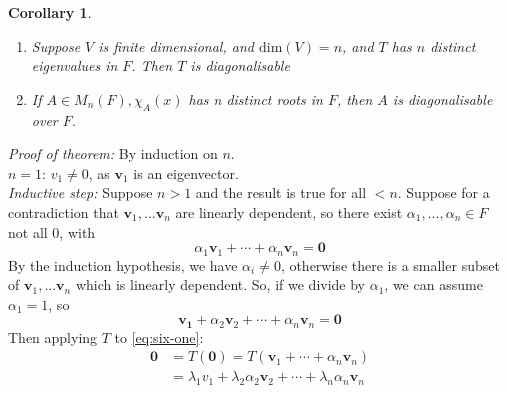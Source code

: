 \documentclass{report}
\newtheorem*{corollary}{Corollary}
\theoremstyle{remark}
\theoremstyle{definition}
\theoremstyle{definition}
\theoremstyle{theorem}
\renewcommand{\v}[1]{\mathbf{#1}}
\begin{document}
\begin{corollary}
\begin{enumerate}[label=(\arabic*)]
    \item Suppose $V$ is finite dimensional, and $\mathrm{dim}(V)=n$, and $T$ has $n$ distinct eigenvalues in $F$. Then $T$ is diagonalisable
    \item If $A \in M_n(F), \chi_A(x)$ has n distinct roots in $F$, then $A$ is diagonalisable over $F$.
\end{enumerate}

\end{corollary}
\emph{Proof of theorem:} By induction on $n$.\\
$n=1$: $v_1\neq 0$, as $\v{v}_1$ is an eigenvector.\\
\emph{Inductive step:} Suppose $n>1$ and the result is true for all $<n$. Suppose for a contradiction that $\v{v}_1,...\v{v}_n$ are linearly dependent, so there exist $\alpha_1,...,\alpha_n \in F$ not all 0, with
\[\alpha_1\v{v}_1+ \cdots + \alpha_n\v{v}_n=\v{0}\]
By the induction hypothesis, we have $\alpha_i\neq 0$, otherwise there is a smaller subset of $\v{v}_1,...\v{v}_n$ which is linearly dependent. So, if we divide by $\alpha_1$, we can assume $\alpha_1=1$, so
\begin{equation}
    \v{v_1}+\alpha_2\v{v}_2+\cdots+\alpha_n\v{v}_n=\v{0}\label{eq:six-one}
\end{equation}
Then applying $T$ to \eqref{eq:six-one}:
\begin{align*}
    \v{0}&=T(\v{0})=T(\v{v}_1+\cdots+\alpha_n\v{v}_n)\\
    &=\lambda_1v_1+\lambda_2\alpha_2\v{v}_2+\cdots+\lambda_n\alpha_n\v{v}_n\\
\end{align*}
\end{document}
